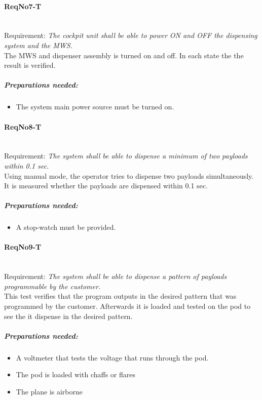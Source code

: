 \paragraph{ReqNo7-T}\mbox{}\\ %
Requirement: \textit{The cockpit unit shall be able to power ON and OFF the dispensing system and the MWS.}
\\
The MWS and dispenser assembly is turned on and off. In each state the the result is verified.

	\subparagraph{Preparations needed:}
	\begin{itemize}
	\item The system main power source must be turned on.
	\end{itemize}


\paragraph{ReqNo8-T}\mbox{}\\ %
Requirement: \textit{The system shall be able to dispense a minimum of two payloads within 0.1 sec.}
\\
Using manual mode, the operator tries to dispense two payloads simultaneously. It is measured whether the payloads are dispensed within 0.1 sec.
\\
	\subparagraph{Preparations needed:}
	\begin{itemize}
	\item A stop-watch must be provided.
	\end{itemize}

\paragraph{ReqNo9-T}\mbox{}\\ %
Requirement: \textit{The system shall be able to dispense a pattern of payloads programmable by the customer.}
\\
This test verifies that the program outputs in the desired pattern that was programmed by the customer. Afterwards it is loaded and tested on the pod to see the it dispense in the desired pattern.
\\
	\subparagraph{Preparations needed:}
	\begin{itemize}
	\item A voltmeter that tests the voltage that runs through the pod.
	\item The pod is loaded with chaffs or flares
	\item The plane is airborne
	\end{itemize}

